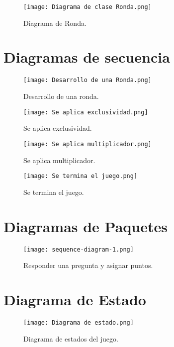 \documentclass[titlepage,a4paper]{article}
\begin{document}
\begin{figure}[H]
\centering
\texttt{[image: Diagrama de clase Ronda.png]}
\caption{\label{fig:seq01}Diagrama de Ronda.}
\end{figure}


\section{Diagramas de secuencia}\label{sec:diagramasdesecuencia}

\begin{figure}[H]
\centering
\texttt{[image: Desarrollo de una Ronda.png]}
\caption{\label{fig:seq01}Desarrollo de una ronda.}
\end{figure}

\begin{figure}[H]
\centering
\texttt{[image: Se aplica exclusividad.png]}
\caption{\label{fig:seq01}Se aplica exclusividad.}
\end{figure}

\begin{figure}[H]
\centering
\texttt{[image: Se aplica multiplicador.png]}
\caption{\label{fig:seq01}Se aplica multiplicador.}
\end{figure}

\begin{figure}[H]
\centering
\texttt{[image: Se termina el juego.png]}
\caption{\label{fig:seq01}Se termina el juego.}
\end{figure}

\section{Diagramas de Paquetes}\label{sec:diagramasdepaquetes}

\begin{figure}[H]
\centering
\texttt{[image: sequence-diagram-1.png]}
\caption{\label{fig:seq01}Responder una pregunta y asignar puntos.}
\end{figure}


\section{Diagrama de Estado}\label{sec:diagramasdeestado}

\begin{figure}[H]
\centering
\texttt{[image: Diagrama de estado.png]}
\caption{\label{fig:seq01}Diagrama de estados del juego.}
\end{figure}
\end{document}
